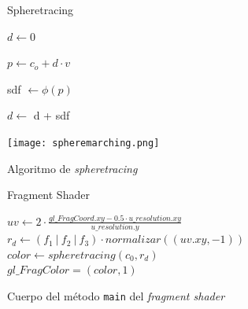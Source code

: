 \begin{figure}[ht!]
    \centering
    \begin{minipage}{0.50\textwidth}
       \begin{algorithm}[H]
            \caption{Spheretracing}
                $d \gets 0$ 
                
                 {
                    $p \gets c_o + d \cdot v$
                    
                    sdf $\gets \phi(p)$
                    
            
                    $d \gets$ d + sdf
            
                }
        \end{algorithm}
    \end{minipage}%
    \hfill
    \begin{minipage}{0.48\textwidth}
        \texttt{[image: spheremarching.png]}
    \end{minipage}
    \caption{Algoritmo de \textit{spheretracing}}
    \label{a:spheretracing}
\end{figure}

\begin{figure}[ht!]
    \centering
    
       \begin{algorithm}[H]
            \caption{Fragment Shader}
            
                $uv \gets 2\cdot \frac{gl\_FragCoord.xy- 0.5\cdot u\_resolution.xy}{u\_resolution.y}$\\[8pt]

                $r_d \gets (f_1\ \vert \ f_2\ \vert \ f_3)\cdot normalizar((uv.xy,-1))$\\[5pt]

                $color \gets spheretracing(c_0, r_d)$\\[5pt]

                $gl\_FragColor = (color, 1)$
        \end{algorithm}
    \caption{Cuerpo del método \texttt{main} del \textit{fragment shader}}
    \label{fig:mainFS}
\end{figure}


